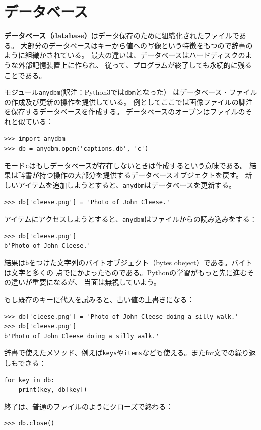 \documentclass[a4j,12pt,makeidx]{jbook}
\begin{document}
\section{データベース}
{\bf データベース（database）}はデータ保存のために組織化されたファイルである。
大部分のデータベースはキーから値への写像という特徴をもつので辞書のように組織かされている。
最大の違いは、データベースはハードディスクのような外部記憶装置上に作られ、
従って、プログラムが終了しても永続的に残ることである。\par
モジュール{\tt anydbm}(訳注：Python3では{\tt dbm}となった）
はデータベース・ファイルの作成及び更新の操作を提供している。
例としてここでは画像ファイルの脚注を保存するデータベースを作成する。
データベースのオープンはファイルのそれと似ている：
\begin{verbatim}
>>> import anydbm
>>> db = anydbm.open('captions.db', 'c')
\end{verbatim}
モード{\tt c}はもしデータベースが存在しないときは作成するという意味である。
結果は辞書が持つ操作の大部分を提供するデータベースオブジェクトを戻す。
新しいアイテムを追加しようとすると、{\tt anydbm}はデータベースを更新する。
\begin{verbatim}
>>> db['cleese.png'] = 'Photo of John Cleese.'
\end{verbatim}
アイテムにアクセスしようとすると、{\tt anydbm}はファイルからの読み込みをする：
\begin{verbatim}
>>> db['cleese.png']
b'Photo of John Cleese.'
\end{verbatim}
結果は{\tt b}をつけた文字列のバイトオブジェクト（bytes obeject）である。バイトは文字と多くの
点でにかよったものである。Pythonの学習がもっと先に進むその違いが重要になるが、
当面は無視していよう。\par
もし既存のキーに代入を試みると、古い値の上書きになる：
\begin{verbatim}
>>> db['cleese.png'] = 'Photo of John Cleese doing a silly walk.'
>>> db['cleese.png']
b'Photo of John Cleese doing a silly walk.'
\end{verbatim}
辞書で使えたメソッド、例えば{\tt keys}や{\tt items}なども使える。またfor文での繰り返しもできる：
\begin{verbatim}
for key in db:
    print(key, db[key])
\end{verbatim}
終了は、普通のファイルのようにクローズで終わる：
\begin{verbatim}
>>> db.close()
\end{verbatim}
%
\end{document}
